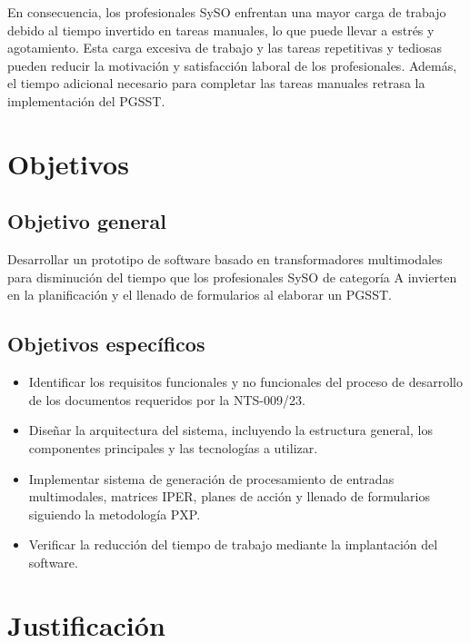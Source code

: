 En consecuencia, los profesionales SySO enfrentan una mayor carga de trabajo debido al tiempo invertido en tareas manuales, lo que puede llevar a estrés y agotamiento. Esta carga excesiva de trabajo y las tareas repetitivas y tediosas pueden reducir la motivación y satisfacción laboral de los profesionales. Además, el tiempo adicional necesario para completar las tareas manuales retrasa la implementación del PGSST.

\section{Objetivos}
\subsection{Objetivo general}
Desarrollar un prototipo de software basado en transformadores multimodales para disminución del tiempo que los profesionales SySO de categoría A invierten en la planificación y el llenado de formularios al elaborar un PGSST.

\subsection{Objetivos específicos}
\begin{itemize}
	\item Identificar los requisitos funcionales y no funcionales del proceso de desarrollo de los documentos requeridos por la NTS-009/23.
	\item Diseñar la arquitectura del sistema, incluyendo la estructura general, los componentes principales y las tecnologías a utilizar.
	\item Implementar sistema de generación de procesamiento de entradas multimodales, matrices IPER, planes de acción y llenado de formularios siguiendo la metodología PXP.
	\item Verificar la reducción del tiempo de trabajo mediante la implantación del software.
\end{itemize}

\section{Justificación}

